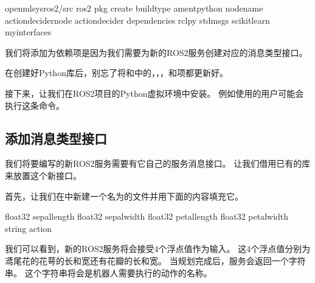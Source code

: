 \documentclass[letterpaper,10pt,english]{sphinxmanual}
\begin{document}
\begin{sphinxVerbatim}[commandchars=\\\{\}]
 openmlsys\PYGZhy{}ros2/src
ros2 pkg create \PYGZhy{}\PYGZhy{}build\PYGZhy{}type ament\PYGZus{}python \PYGZhy{}\PYGZhy{}node\PYGZhy{}name action\PYGZus{}decider\PYGZus{}node action\PYGZus{}decider \PYGZhy{}\PYGZhy{}dependencies rclpy std\PYGZus{}msgs scikit\PYGZhy{}learn my\PYGZus{}interfaces
\end{sphinxVerbatim}

\sphinxAtStartPar
我们将添加为依赖项是因为我们需要为新的ROS2服务创建对应的消息类型接口。

\sphinxAtStartPar
在创建好Python库后，别忘了将和中的，，，和项都更新好。

\sphinxAtStartPar
接下来，让我们在ROS2项目的Python虚拟环境中安装。
例如使用的用户可能会执行这条命令。


\subsection{添加消息类型接口}
\label{\detokenize{chapter_rl_sys/planning_code_ex:id4}}
\sphinxAtStartPar
我们将要编写的新ROS2服务需要有它自己的服务消息接口。
让我们借用已有的库来放置这个新接口。

\sphinxAtStartPar
首先，让我们在中新建一个名为的文件并用下面的内容填充它。

\begin{sphinxVerbatim}[commandchars=\\\{\}]
float32 sepal\PYGZus{}length
float32 sepal\PYGZus{}width
float32 petal\PYGZus{}length
float32 petal\PYGZus{}width
\PYGZhy{}\PYGZhy{}\PYGZhy{}
string action
\end{sphinxVerbatim}

\sphinxAtStartPar
我们可以看到，新的ROS2服务将会接受4个浮点值作为输入。
这4个浮点值分别为鸢尾花的花萼的长和宽还有花瓣的长和宽。
当规划完成后，服务会返回一个字符串。
这个字符串将会是机器人需要执行的动作的名称。
\end{document}
